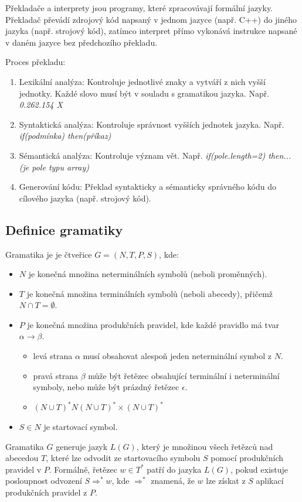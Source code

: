 Překladače a interprety jsou programy, které zpracovávají formální jazyky. 
Překladač převádí zdrojový kód napsaný v jednom jazyce (např. C++) do jiného jazyka 
(např. strojový kód), zatímco interpret přímo vykonává instrukce napsané v daném 
jazyce bez předchozího překladu.

Proces překladu:
\begin{enumerate}
\item Lexikální analýza: Kontroluje jednotlivé znaky a vytváří z nich vyšší jednotky. 
Každé slovo musí být v souladu s gramatikou jazyka.
\newline
Např. \textit{0.262.154 X  \checkmark}
\item Syntaktická analýza: Kontroluje správnost vyšších jednotek jazyka. 
\newline
Např. \textit{if(podmínka) then(příkaz)}
\item Sémantická analýza: Kontroluje význam vět.
\newline
Např. \textit{if(pole.length=2) then... (je pole typu array)}
\item Generování kódu: Překlad syntakticky a sémanticky správného kódu do cílového jazyka (např. strojový kód).
\end{enumerate}

\subsection{Definice gramatiky}
Gramatika je je čtveřice $G = (N, T, P, S)$, kde:
\begin{itemize}
\item $N$ je konečná množina neterminálních symbolů (neboli proměnných).
\item $T$ je konečná množina terminálních symbolů (neboli abecedy), přičemž $N \cap T = \emptyset$.
\item $P$ je konečná množina produkčních pravidel, kde každé pravidlo má tvar $\alpha \to \beta$.
\begin{itemize}
    \item levá strana $\alpha$ musí obsahovat alespoň jeden neterminální symbol z $N$.
    \item pravá strana $\beta$ může být řetězec obsahující terminální i neterminální symboly, nebo může být prázdný řetězec $\epsilon$.
    \item $(N \cup T)^*N(N \cup T)^* \times (N \cup T)^*$ 
\end{itemize}
\item $S \in N$ je startovací symbol.
\end{itemize}
Gramatika $G$ generuje jazyk $L(G)$, který je množinou všech řetězců nad abecedou $T$, 
které lze odvodit ze startovacího symbolu $S$ pomocí produkčních pravidel v $P$. 
Formálně, řetězec $w \in T^*$ patří do jazyka $L(G)$, pokud existuje posloupnost 
odvození $S \Rightarrow^* w$, kde $\Rightarrow^*$ znamená, že $w$ lze získat z $S$ 
aplikací produkčních pravidel z $P$.

